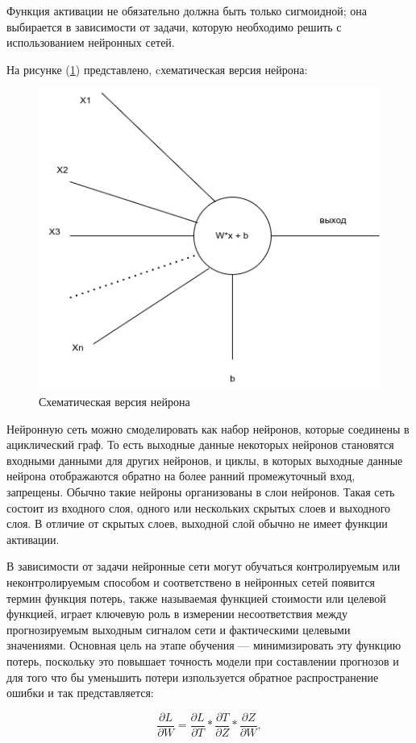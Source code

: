 Функция активации не обязательно должна быть только сигмоидной; она выбирается в зависимости от задачи, которую необходимо решить с использованием нейронных сетей.

На рисунке (\ref{fig:neuron}) представлено, cхематическая версия нейрона: 
\begin{figure}[H]
	\centering
	\includegraphics[width=0.5\linewidth]{assets/neuron.png}
	\caption{Схематическая версия нейрона}
	\label{fig:neuron}
\end{figure}

Нейронную сеть можно смоделировать как набор нейронов, которые соединены в ациклический граф. То есть выходные данные некоторых нейронов становятся входными данными для других нейронов, и циклы, в которых выходные данные нейрона отображаются обратно на более ранний промежуточный вход, запрещены. Обычно такие нейроны организованы в слои нейронов. Такая сеть состоит из входного слоя, одного или нескольких скрытых слоев и выходного слоя. В отличие от скрытых слоев, выходной слой обычно не имеет функции активации.

В зависимости от задачи нейронные сети могут обучаться контролируемым или неконтролируемым способом и соответствено в нейронных сетей появится термин функция потерь, также называемая функцией стоимости или целевой функцией, играет ключевую роль в измерении несоответствия между прогнозируемым выходным сигналом сети и фактическими целевыми значениями. Основная цель на этапе обучения — минимизировать эту функцию потерь, поскольку это повышает точность модели при составлении прогнозов и для того что бы уменьшить потери изпользуется обратное распространение ошибки и так представляется:

\begin{equation}
    \frac{\partial L}{\partial W} = \frac{\partial L}{\partial T} * \frac{\partial T}{\partial Z} * \frac{\partial Z}{\partial W}
, \end{equation}

